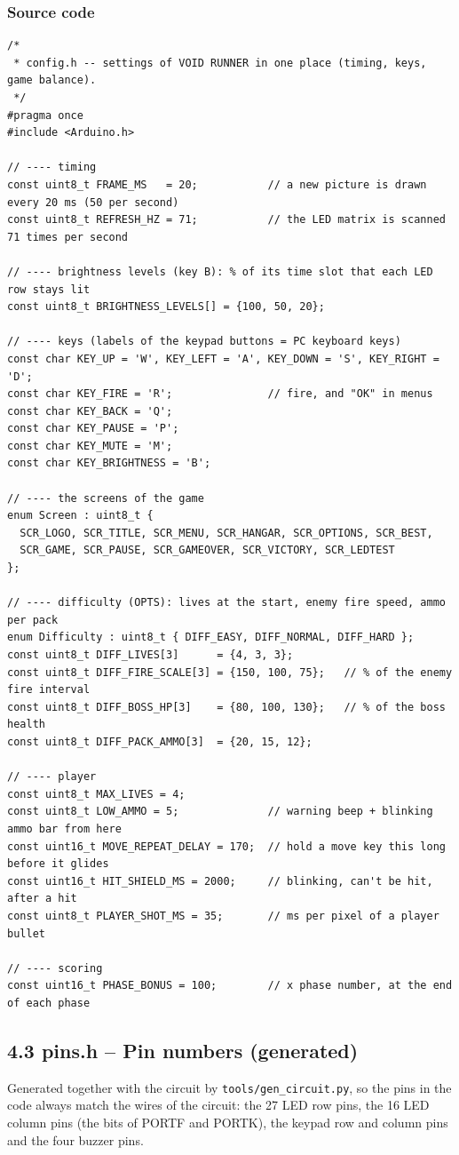 \documentclass[11pt,a4paper]{article}
\begin{document}
\subsubsection*{Source code}
\begin{lstlisting}[language=Arduino]
/*
 * config.h -- settings of VOID RUNNER in one place (timing, keys, game balance).
 */
#pragma once
#include <Arduino.h>

// ---- timing
const uint8_t FRAME_MS   = 20;           // a new picture is drawn every 20 ms (50 per second)
const uint8_t REFRESH_HZ = 71;           // the LED matrix is scanned 71 times per second

// ---- brightness levels (key B): % of its time slot that each LED row stays lit
const uint8_t BRIGHTNESS_LEVELS[] = {100, 50, 20};

// ---- keys (labels of the keypad buttons = PC keyboard keys)
const char KEY_UP = 'W', KEY_LEFT = 'A', KEY_DOWN = 'S', KEY_RIGHT = 'D';
const char KEY_FIRE = 'R';               // fire, and "OK" in menus
const char KEY_BACK = 'Q';
const char KEY_PAUSE = 'P';
const char KEY_MUTE = 'M';
const char KEY_BRIGHTNESS = 'B';

// ---- the screens of the game
enum Screen : uint8_t {
  SCR_LOGO, SCR_TITLE, SCR_MENU, SCR_HANGAR, SCR_OPTIONS, SCR_BEST,
  SCR_GAME, SCR_PAUSE, SCR_GAMEOVER, SCR_VICTORY, SCR_LEDTEST
};

// ---- difficulty (OPTS): lives at the start, enemy fire speed, ammo per pack
enum Difficulty : uint8_t { DIFF_EASY, DIFF_NORMAL, DIFF_HARD };
const uint8_t DIFF_LIVES[3]      = {4, 3, 3};
const uint8_t DIFF_FIRE_SCALE[3] = {150, 100, 75};   // % of the enemy fire interval
const uint8_t DIFF_BOSS_HP[3]    = {80, 100, 130};   // % of the boss health
const uint8_t DIFF_PACK_AMMO[3]  = {20, 15, 12};

// ---- player
const uint8_t MAX_LIVES = 4;
const uint8_t LOW_AMMO = 5;              // warning beep + blinking ammo bar from here
const uint16_t MOVE_REPEAT_DELAY = 170;  // hold a move key this long before it glides
const uint16_t HIT_SHIELD_MS = 2000;     // blinking, can't be hit, after a hit
const uint8_t PLAYER_SHOT_MS = 35;       // ms per pixel of a player bullet

// ---- scoring
const uint16_t PHASE_BONUS = 100;        // x phase number, at the end of each phase
\end{lstlisting}

\clearpage
\subsection*{4.3 pins.h – Pin numbers (generated)}
Generated together with the circuit by \texttt{tools/gen\_circuit.py}, so the pins in the code always match the wires of the circuit: the 27 LED row pins, the 16 LED column pins (the bits of PORTF and PORTK), the keypad row and column pins and the four buzzer pins.
\end{document}

